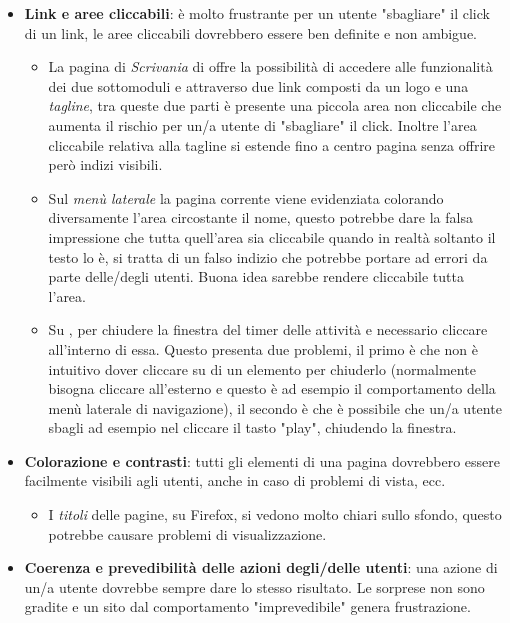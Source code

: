 \begin{itemize}
\item \textbf{Link e aree cliccabili}: è molto frustrante per un utente "sbagliare"
il click di un link, le aree cliccabili dovrebbero essere ben definite e non ambigue.
	\begin{itemize}
	\item La pagina di \textit{Scrivania} di \fiscoloWeb{} offre la possibilità di accedere
	alle funzionalità dei due sottomoduli \fiscolo{} e \resa{} attraverso due link
	composti da un logo e una \textit{tagline}, tra queste due parti è presente una piccola
	area non cliccabile che aumenta il rischio per un/a utente di "sbagliare" il click.
	Inoltre l'area cliccabile relativa alla tagline si estende fino a centro pagina senza
	offrire però indizi visibili.
	\item Sul \textit{menù laterale} la pagina corrente viene evidenziata colorando diversamente
	l'area circostante il nome, questo potrebbe dare la falsa impressione che tutta quell'area
	sia cliccabile quando in realtà soltanto il testo lo è, si tratta di un falso indizio che
	potrebbe portare ad errori da parte delle/degli utenti. Buona idea sarebbe rendere cliccabile
	tutta l'area.
	\item Su \textit{\resa{}}, per chiudere la finestra del timer delle attività e necessario cliccare
	all'interno di essa. Questo presenta due problemi, il primo è che non è intuitivo dover
	cliccare su di un elemento per chiuderlo (normalmente bisogna cliccare all'esterno e questo
	è ad esempio il comportamento della menù laterale di navigazione), il secondo è che è
	possibile che un/a utente sbagli ad esempio nel cliccare il tasto "play", chiudendo la
	finestra.
	\end{itemize}
\item \textbf{Colorazione e contrasti}: tutti gli elementi di una pagina dovrebbero
essere facilmente visibili agli utenti, anche in caso di problemi di vista, ecc.
	\begin{itemize}
	\item I \textit{titoli} delle pagine, su Firefox, si vedono molto chiari sullo sfondo,
	questo potrebbe causare problemi di visualizzazione.
	\end{itemize}
\item \textbf{Coerenza e prevedibilità delle azioni degli/delle utenti}: una azione di un/a
utente dovrebbe sempre dare lo stesso risultato. Le sorprese non sono gradite e un sito
dal comportamento "imprevedibile" genera frustrazione.
	\begin{itemize}

\end{itemize}
\end{itemize}
